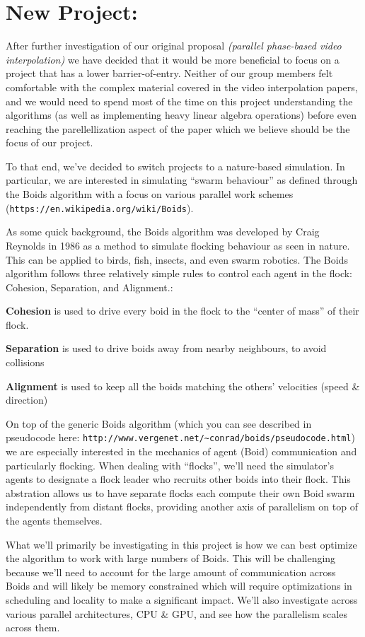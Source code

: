 \documentclass[12pt]{article}
\begin{document}
\section*{New Project:} 
\par After further investigation of our original proposal \textit{(parallel phase-based video interpolation)} we have decided that it would be more beneficial to focus on a project that has a lower barrier-of-entry. Neither of our group members felt comfortable with the complex material covered in the video interpolation papers, and we would need to spend most of the time on this project understanding the algorithms (as well as implementing heavy linear algebra operations) before even reaching the parellellization aspect of the paper which we believe should be the focus of our project.
\par To that end, we've decided to switch projects to a nature-based simulation. In particular, we are interested in simulating ``swarm behaviour'' as defined through the Boids algorithm with a focus on various parallel work schemes (\texttt{https://en.wikipedia.org/wiki/Boids}). 
\par As some quick background, the Boids algorithm was developed by Craig Reynolds in 1986 as a method to simulate flocking behaviour as seen in nature. This can be applied to birds, fish, insects, and even swarm robotics. The Boids algorithm follows three relatively simple rules to control each agent in the flock: Cohesion, Separation, and Alignment.:
\par \textbf{Cohesion} is used to drive every boid in the flock to the ``center of mass'' of their flock.
\par \textbf{Separation} is used to drive boids away from nearby neighbours, to avoid collisions
\par \textbf{Alignment} is used to keep all the boids matching the others' velocities (speed \& direction)\\
\par On top of the generic Boids algorithm (which you can see described in pseudocode here: \texttt{http://www.vergenet.net/{\textasciitilde}conrad/boids/pseudocode.html}) we are especially interested in the mechanics of agent (Boid) communication and particularly flocking. When dealing with ``flocks'', we'll need the simulator's agents to designate a flock leader who recruits other boids into their flock. This abstration allows us to have separate flocks each compute their own Boid swarm independently from distant flocks, providing another axis of parallelism on top of the agents themselves.
\par What we'll primarily be investigating in this project is how we can best optimize the algorithm to work with large numbers of Boids. This will be challenging because we'll need to account for the large amount of communication across Boids and will likely be memory constrained which will require optimizations in scheduling and locality to make a significant impact. We'll also investigate across various parallel architectures, CPU \& GPU, and see how the parallelism scales across them.
\end{document}
